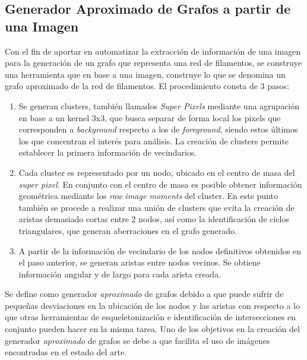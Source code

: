 \subsection{Generador Aproximado de Grafos a partir de una Imagen}

Con el fin de aportar en automatizar la extracci\'on de informaci\'on de una imagen para la generaci\'on de un grafo que representa una red de filamentos, se construye una herramienta que en base a una imagen, construye lo que se denomina un grafo aproximado de la red de filamentos. El procedimiento consta de 3 pasos:

\begin{enumerate}
    \item Se generan clusters, tambi\'en llamados {\it Super Pixels} mediante una agrupaci\'on en base a un kernel 3x3, que busca separar de forma local los pixels que corresponden a {\it background} respecto a los de {\it foreground}, siendo estos \'ultimos los que concentran el inter\'es para an\'alisis. La creaci\'on de clusters permite establecer la primera informaci\'on de vecindarios.
    \item Cada cluster es representado por un nodo, ubicado en el centro de masa del {\it super pixel}. En conjunto con el centro de masa es posible obtener informaci\'on geom\'etrica mediante los {\it raw image moments}\cite{chaumette2004image} del cluster. En este punto tambi\'en se procede a realizar una uni\'on de clusters que evita la creaci\'on de aristas demasiado cortas entre 2 nodos, as\'i como la identificaci\'on de ciclos triangulares, que generan aberraciones en el grafo generado.
    \item A partir de la informaci\'on de vecindario de los nodos definitivos obtenidos en el paso anterior, se generan aristas entre nodos vecinos. Se obtiene informaci\'on angular y de largo para cada arista creada.
\end{enumerate}

Se define como generador {\it aproximado} de grafos debido a que puede sufrir de peque\~nas desviaciones en la ubicaci\'on de los nodos y las aristas con respecto a lo que otras herramientas de esqueletonizaci\'on e identificaci\'on de intersecciones en conjunto pueden hacer en la misma tarea. Uno de los objetivos en la creaci\'on del generador {\it aproximado} de grafos se debe a que facilita el uso de im\'agenes encontradas en el estado del arte.

